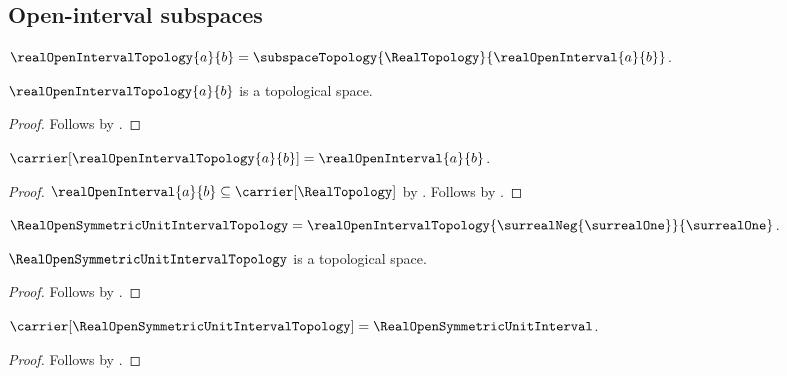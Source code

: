 \subsection{Open-interval subspaces}

\begin{definition}\label{real_open_interval_topology}
    $\realOpenIntervalTopology{a}{b}=
        \subspaceTopology{\RealTopology}{\realOpenInterval{a}{b}}$.
\end{definition}

\begin{theorem}\label{real_open_interval_topology_is_topological_space}
    $\realOpenIntervalTopology{a}{b}$ is a topological space.
\end{theorem}
\begin{proof}
    Follows by
        .
\end{proof}

\begin{proposition}\label{real_open_interval_topology_carrier}
    $\carrier[\realOpenIntervalTopology{a}{b}]
        =\realOpenInterval{a}{b}$.
\end{proposition}
\begin{proof}
    $\realOpenInterval{a}{b}\subseteq\carrier[\RealTopology]$
        by .
    Follows by
        .
\end{proof}

\begin{definition}\label{real_open_symmetric_unit_interval_topology}
    $\RealOpenSymmetricUnitIntervalTopology=
        \realOpenIntervalTopology{\surrealNeg{\surrealOne}}
            {\surrealOne}$.
\end{definition}

\begin{theorem}\label{real_open_symmetric_unit_interval_topology_is_topological_space}
    $\RealOpenSymmetricUnitIntervalTopology$ is a topological space.
\end{theorem}
\begin{proof}
    Follows by
        .
\end{proof}

\begin{proposition}\label{real_open_symmetric_unit_interval_topology_carrier}
    $\carrier[\RealOpenSymmetricUnitIntervalTopology]
        =\RealOpenSymmetricUnitInterval$.
\end{proposition}
\begin{proof}
    Follows by
        .
\end{proof}

